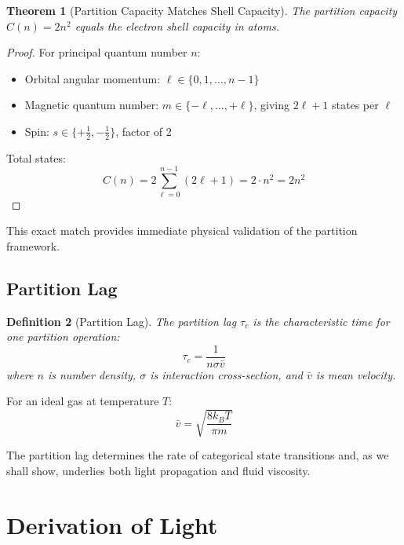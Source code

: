 \documentclass[aps,prl,twocolumn,superscriptaddress,floatfix]{revtex4-2}
\newtheorem{theorem}{Theorem}
\newtheorem{definition}[theorem]{Definition}
\begin{document}
\begin{theorem}[Partition Capacity Matches Shell Capacity]
The partition capacity $C(n) = 2n^2$ equals the electron shell capacity in atoms.
\end{theorem}

\begin{proof}
For principal quantum number $n$:
\begin{itemize}
\item Orbital angular momentum: $\ell \in \{0, 1, \ldots, n-1\}$
\item Magnetic quantum number: $m \in \{-\ell, \ldots, +\ell\}$, giving $2\ell + 1$ states per $\ell$
\item Spin: $s \in \{+\tfrac{1}{2}, -\tfrac{1}{2}\}$, factor of 2
\end{itemize}
Total states:
\begin{equation}
C(n) = 2 \sum_{\ell=0}^{n-1} (2\ell + 1) = 2 \cdot n^2 = 2n^2
\end{equation}
\end{proof}

This exact match provides immediate physical validation of the partition framework.

\subsection{Partition Lag}

\begin{definition}[Partition Lag]
The partition lag $\tau_c$ is the characteristic time for one partition operation:
\begin{equation}
\tau_c = \frac{1}{n \sigma \bar{v}}
\end{equation}
where $n$ is number density, $\sigma$ is interaction cross-section, and $\bar{v}$ is mean velocity.
\end{definition}

For an ideal gas at temperature $T$:
\begin{equation}
\bar{v} = \sqrt{\frac{8 k_B T}{\pi m}}
\end{equation}

The partition lag determines the rate of categorical state transitions and, as we shall show, underlies both light propagation and fluid viscosity.

\section{Derivation of Light}
\end{document}
